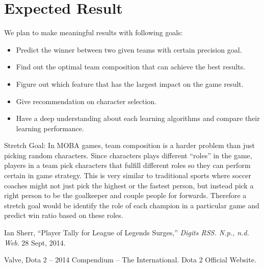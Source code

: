\documentclass[a4page]{article}
\begin{document}
\section{Expected Result}
We plan to make meaningful results with following goals:

\begin{itemize}
\setlength\itemsep{-1.5mm}
  \item Predict the winner between two given teams with certain precision goal.
  \item Find out the optimal team composition that can achieve the best results.
  \item Figure out which feature that has the largest impact on the game result.
  \item Give recommendation on character selection.
  \item Have a deep understanding about each learning algorithms and compare their learning performance.
\end{itemize}

Stretch Goal:
In MOBA games, team composition is a harder problem than just picking random characters. Since characters plays different ``roles'' in the game, players in a team pick characters that fulfill different roles so they can perform certain in game strategy. This is very similar to traditional sports where soccer coaches might not just pick the highest or the fastest person, but instead pick a right person to be the goalkeeper and couple people for forwards. Therefore a stretch goal would be identify the role of each champion in a particular game and predict win ratio based on these roles.



\begin{thebibliography}{10}

Ian Sherr, ``Player Tally for League of Legends Surges,'' \textit{Digits RSS. N.p., n.d. Web}. 28 Sept, 2014.

Valve, Dota 2 -- 2014 Compendium -- The International. Dota 2 Official Website.

\end{thebibliography}
\end{document}
